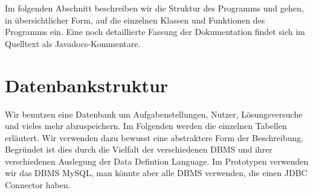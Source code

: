 



Im folgenden Abschnitt beschreiben wir die Struktur des Programms und gehen, in übersichtlicher Form, auf die einzelnen Klassen und Funktionen des Programms ein. Eine noch detaillierte Fassung der Dokumentation findet sich im Quelltext als Javadocs-Kommentare.

\section{Datenbankstruktur}

Wir benutzen eine Datenbank um Aufgabenstellungen, Nutzer, Lösungsversuche und vieles mehr abzuspeichern. Im Folgenden werden die einzelnen Tabellen erläutert. Wir verwenden dazu bewusst eine abstraktere Form der Beschreibung. Begründet ist dies durch die Vielfalt der verschiedenen DBMS und ihrer verschiedenen Auslegung der Data Defintion Language. Im Prototypen verwenden wir das DBMS MySQL, man könnte aber alle DBMS verwenden, die einen JDBC Connector haben.

